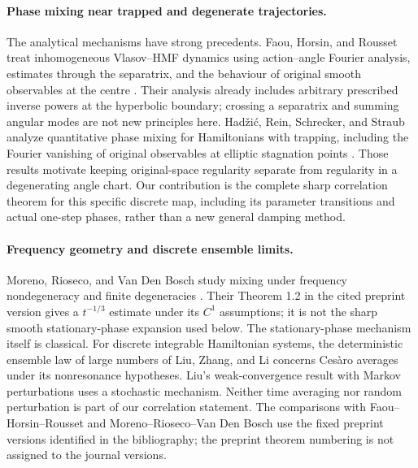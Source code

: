 \paragraph{Phase mixing near trapped and degenerate trajectories.}
The analytical mechanisms have strong precedents. Faou, Horsin, and
Rousset treat inhomogeneous Vlasov--HMF dynamics using action--angle
Fourier analysis, estimates through the separatrix, and the behaviour
of original smooth observables at the centre
\cite{FaouHorsinRousset2021}. Their analysis already includes arbitrary
prescribed inverse powers at the hyperbolic boundary; crossing a
separatrix and summing angular modes are not new principles here.
Had\v zi\'c, Rein, Schrecker, and Straub analyze quantitative phase
mixing for Hamiltonians with trapping, including the Fourier
vanishing of original observables at elliptic stagnation points
\cite{HadzicReinSchreckerStraub2024}. Those results motivate keeping
original-space regularity separate from regularity in a degenerating
angle chart. Our contribution is the complete sharp correlation
theorem for this specific discrete map, including its parameter
transitions and actual one-step phases, rather than a new general
damping method.

\paragraph{Frequency geometry and discrete ensemble limits.}
Moreno, Rioseco, and Van Den Bosch study mixing under frequency
nondegeneracy and finite degeneracies
\cite{MorenoRiosecoVanDenBosch2022}. Their Theorem 1.2 in the cited
preprint version gives a $t^{-1/3}$ estimate under its $C^1$
assumptions; it is not the sharp smooth stationary-phase expansion
used below. The stationary-phase mechanism itself is classical.
For discrete integrable Hamiltonian systems, the deterministic
ensemble law of large numbers of Liu, Zhang, and Li
\cite[Theorem 3.1]{LiuZhangLi2025} concerns Ces\`aro averages under
its nonresonance hypotheses. Liu's weak-convergence result with
Markov perturbations \cite{Liu2026Markov} uses a stochastic mechanism.
Neither time averaging nor random perturbation is part of our
correlation statement. The comparisons with
Faou--Horsin--Rousset and Moreno--Rioseco--Van Den Bosch use the
fixed preprint versions identified in the bibliography; the preprint
theorem numbering is not assigned to the journal versions.

